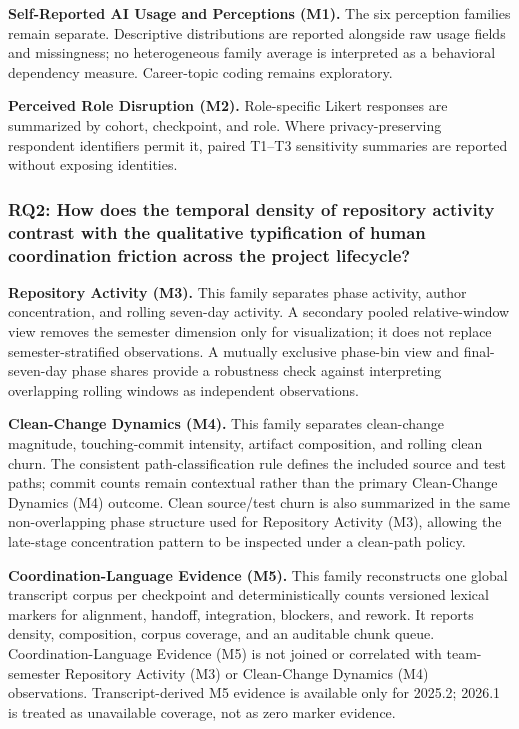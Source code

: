 \textbf{Self-Reported AI Usage and Perceptions (M1).} The six perception
families remain separate. Descriptive distributions are reported alongside raw
usage fields and missingness; no heterogeneous family average is interpreted as
a behavioral dependency measure. Career-topic coding remains exploratory.

\textbf{Perceived Role Disruption (M2).} Role-specific Likert responses are
summarized by cohort, checkpoint, and role. Where privacy-preserving respondent
identifiers permit it, paired T1--T3 sensitivity summaries are reported without
exposing identities.

\subsubsection{RQ2: How does the temporal density of repository activity contrast with the qualitative typification of human coordination friction across the project lifecycle?}

\textbf{Repository Activity (M3).} This family separates phase activity, author
concentration, and rolling seven-day activity. A secondary pooled relative-window
view removes the semester dimension only for visualization; it does not replace
semester-stratified observations. A mutually exclusive phase-bin view and
final-seven-day phase shares provide a robustness check against interpreting
overlapping rolling windows as independent observations.

\textbf{Clean-Change Dynamics (M4).} This family separates clean-change magnitude,
touching-commit intensity, artifact composition, and rolling clean churn. The
consistent path-classification rule defines the included source and test paths;
commit counts remain contextual rather than the primary Clean-Change Dynamics
(M4) outcome. Clean source/test churn is also summarized in the same
non-overlapping phase structure used for Repository Activity (M3), allowing the
late-stage concentration pattern to be inspected under a clean-path policy.

\textbf{Coordination-Language Evidence (M5).} This family reconstructs one global transcript
corpus per checkpoint and deterministically counts versioned lexical markers for
alignment, handoff, integration, blockers, and rework. It reports density,
composition, corpus coverage, and an auditable chunk queue.
Coordination-Language Evidence (M5) is not joined or correlated with
team-semester Repository Activity (M3) or Clean-Change Dynamics (M4)
observations. Transcript-derived M5 evidence is available only for 2025.2;
2026.1 is treated as unavailable coverage, not as zero marker evidence.

